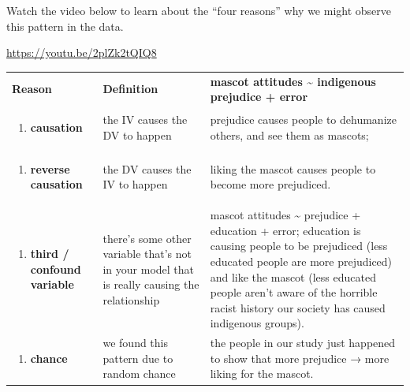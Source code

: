 \documentclass[
  letterpaper,
  DIV=11,
  numbers=noendperiod,
  oneside]{scrreprt}
\providecommand{\tightlist}{%
  \setlength{\itemsep}{0pt}\setlength{\parskip}{0pt}}\usepackage{longtable,booktabs,array}
\begin{document}
Watch the video below to learn about the ``four reasons'' why we might
observe this pattern in the data.

\url{https://youtu.be/2plZk2tQIQ8}

\begin{longtable}[]{@{}
  >{\raggedright\arraybackslash}p{}
  >{\raggedright\arraybackslash}p{}
  >{\raggedright\arraybackslash}p{}@{}}
\toprule\noalign{}
\endhead
\bottomrule\noalign{}
\endlastfoot
\textbf{Reason} & \textbf{Definition} & \textbf{mascot attitudes
\textasciitilde{} indigenous prejudice + error} \\
\begin{minipage}[t]{\linewidth}\raggedright
\begin{enumerate}
\def\labelenumi{\arabic{enumi}.}
\tightlist
\item
  \textbf{causation}
\end{enumerate}
\end{minipage} & the IV causes the DV to happen & prejudice causes
people to dehumanize others, and see them as mascots; \\
\begin{minipage}[t]{\linewidth}\raggedright
\begin{enumerate}
\def\labelenumi{\arabic{enumi}.}
\setcounter{enumi}{1}
\tightlist
\item
  \textbf{reverse causation}
\end{enumerate}
\end{minipage} & the DV causes the IV to happen & liking the mascot
causes people to become more prejudiced. \\
\begin{minipage}[t]{\linewidth}\raggedright
\begin{enumerate}
\def\labelenumi{\arabic{enumi}.}
\setcounter{enumi}{2}
\tightlist
\item
  \textbf{third / confound variable}
\end{enumerate}
\end{minipage} & there's some other variable that's not in your model
that is really causing the relationship & mascot attitudes
\textasciitilde{} prejudice + education + error; education is causing
people to be prejudiced (less educated people are more prejudiced) and
like the mascot (less educated people aren't aware of the horrible
racist history our society has caused indigenous groups). \\
\begin{minipage}[t]{\linewidth}\raggedright
\begin{enumerate}
\def\labelenumi{\arabic{enumi}.}
\setcounter{enumi}{3}
\tightlist
\item
  \textbf{chance}
\end{enumerate}
\end{minipage} & we found this pattern due to random chance & the people
in our study just happened to show that more prejudice → more liking for
the mascot. \\
\end{longtable}
\end{document}
